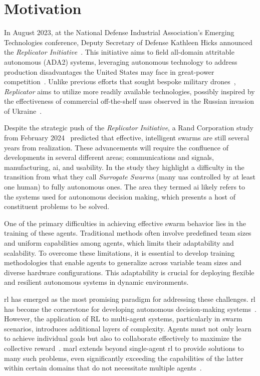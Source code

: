 \section{Motivation}%
\label{sec:motivation}

In August 2023, at the National Defense Industrial Association's 
Emerging Technologies conference, Deputy Secretary of Defense Kathleen Hicks 
announced the \emph{Replicator Initiative}~\cite{robertson2023}. 
This initiative aims to field all-domain attritable autonomous (ADA2) systems,
leveraging autonomous technology to address production disadvantages the 
United States may face in great-power competition~\cite{zotero-2656}. 
Unlike previous efforts that sought bespoke military drones~\cite{bajak2023}, 
\emph{Replicator} aims to utilize more readily available technologies, 
possibly inspired by the effectiveness of commercial off-the-shelf \glspl{uas} 
observed in the Russian invasion of Ukraine~\cite{bajak2023a}.

Despite the strategic push of the \emph{Replicator Initiative}, 
a Rand Corporation study from February 2024~\cite{gerstein2024} predicted 
that effective, intelligent swarms are still several years from realization. 
These advancements will require the confluence of developments in several 
different areas; communications and signals, manufacturing, \gls{ai},
and usability. In the study they highlight a difficulty in the transition 
from what they call \emph{Surrogate Swarms} (many \gls{uas} controlled
by at least one human) to fully autonomous ones.
The area they termed \gls*{ai} likely refers to the systems used for autonomous 
decision making, which presents a host of constituent problems to be solved.

One of the primary difficulties in achieving effective swarm behavior 
lies in the training of these agents. Traditional methods often 
involve predefined team sizes and uniform capabilities among agents, 
which limits their adaptability and scalability. To overcome these limitations, 
it is essential to develop training methodologies that enable agents to 
generalize across variable team sizes and diverse hardware configurations. 
This adaptability is crucial for deploying flexible and resilient autonomous 
systems in dynamic environments.

\Gls{rl} has emerged as the most promising paradigm for addressing 
these challenges. \Gls{rl} has become the cornerstone for developing 
autonomous decision-making systems~\cite{sutton2018}. However, 
the application of RL to multi-agent systems, particularly in swarm scenarios, 
introduces additional layers of complexity. 
Agents must not only learn to achieve individual goals but also to 
collaborate effectively to maximize the collective reward~\cite{cao2012}.
\Gls{marl} extends beyond single-agent \gls{rl} to provide solutions 
to many such problems, even significantly exceeding the capabilities 
of the latter within certain domains that do not necessitate multiple 
agents~\cite{gronauer2022}. 

